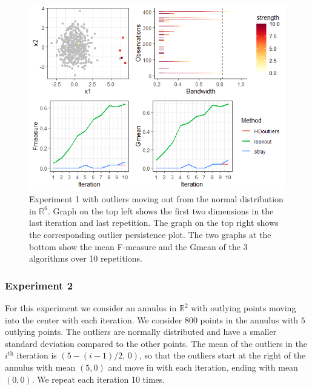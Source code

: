 \documentclass[letter,12pt]{article}
\begin{document}
\begin{figure}[!ht]
    \centering
    \includegraphics[scale=0.8]{Graphics/Comparison_Ex1.png}
    \caption{Experiment 1 with outliers moving out from the normal distribution in $\mathbb{R}^6$. Graph on the top left shows the first two dimensions in the last iteration and last repetition. The graph on the top right shows the corresponding outlier persistence plot. The  two graphs at the bottom show the mean F-measure and the Gmean of the 3 algorithms over 10 repetitions. }
    \label{fig:ComparisonEx1}
\end{figure}

\subsubsection{Experiment 2}\label{sec:exp2}
For this experiment we consider an annulus in $\mathbb{R}^2$ with outlying points moving into the center with each iteration.  We consider $800$ points in the annulus with $5$ outlying points. The outliers are normally distributed and have a smaller standard deviation compared to the other points. The mean of the outliers in the $i^{\text{th}}$ iteration is $\left( 5 - (i-1) /2, \, 0 \right)$, so that the outliers start at the right of the annulus with mean $(5,0)$ and move in with each iteration, ending with mean $(0,0)$.  We repeat each iteration 10 times. 
\end{document}
